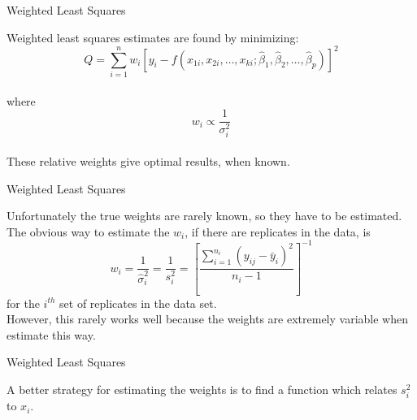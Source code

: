 {{\begin{figure}
\end{figure}
\begin{figure}
\end{figure}
\begin{figure}
\end{figure}
\begin{figure}
\end{figure}
\newpage
\begin{center}
Weighted Least Squares
\end{center}
\vspace{0.5in}
Weighted least squares estimates are found by minimizing:
\vspace{0.5in}
\[
Q=\sum_{i=1}^{n}w_i[y_i-f(x_{1i},x_{2i},\ldots,x_{ki};\hat{\beta}_1,\hat{\beta}_2,\ldots,\hat{\beta}_p)]^2
\] \\
\vspace{0.25in}
where  \\
\vspace{0.25in}
\[ w_i \propto \frac{1}{\sigma^2_i} \] \\
\vspace{0.5in}
These relative weights give optimal results, when known.
\newpage
\begin{center}
Weighted Least Squares
\end{center}
\vspace{0.5in}
Unfortunately the true weights are rarely known, so they
have to be estimated. \\
\vspace{0.5in}
The obvious way to estimate the $w_i$, if there are replicates
in the data, is
\[ w_i = \frac{1}{\hat{\sigma}^2_i} = \frac{1}{s^2_i} = 
         [\frac{\sum_{i=1}^{n_i}(y_{ij}-\bar{y}_i)^2}{n_i-1}]^{-1} \]
for the $i^{th}$ set of replicates in the data set. \\
\vspace{0.5in}
However, this rarely works well because the weights are
extremely variable when estimate this way.
\newpage
\begin{center}
Weighted Least Squares
\end{center}
\vspace{0.5in}
A better strategy for estimating the weights is to find a function which relates
$s_i^2$ to $x_i$. \\
\vspace{0.5in}
}}
